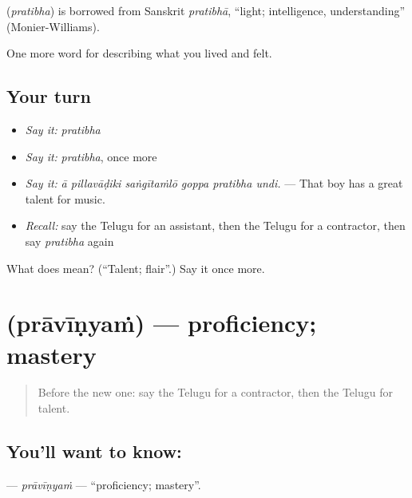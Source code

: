 \begin{cousinweb}
\textbf{} (\emph{pratibha}) is borrowed from Sanskrit \emph{pratibhā}, \textquotedblleft{}light; intelligence, understanding\textquotedblright{} (Monier-Williams).
\end{cousinweb}

\begin{grammarlens}[title={What you've built}]
One more word for describing what you lived and felt.
\end{grammarlens}

\subsection*{Your turn}
\begin{itemize}
\raggedright
  \item \emph{Say it:} \emph{pratibha}
  \item \emph{Say it:} \emph{pratibha}, once more
  \item \emph{Say it:} \emph{ā pillavāḍiki saṅgītaṁlō goppa pratibha undi.} — That boy has a great talent for music.
  \item \emph{Recall:} say the Telugu for an assistant, then the Telugu for a contractor, then say \emph{pratibha} again
\end{itemize}

\begin{tcolorbox}[breakable,colback=teal!4,colframe=teal!35!black,title={Before you move on}]
What does  mean? (\textquotedblleft{}Talent; flair\textquotedblright{}.) Say it once more.
\end{tcolorbox}
\section[\texorpdfstring{\te{ప్రావీణ్యం} (prāvīṇyaṁ)}{ప్రావీణ్యం (prāvīṇyaṁ)}]{ (prāvīṇyaṁ) — proficiency; mastery}

\label{lesson:TE-C524-pravinyam}



\begin{quote}
Before the new one: say the Telugu for a contractor, then the Telugu for talent.
\end{quote}

\subsection*{You'll want to know: }
\textbf{} — \emph{prāvīṇyaṁ} — \textquotedblleft{}proficiency; mastery\textquotedblright{}.


